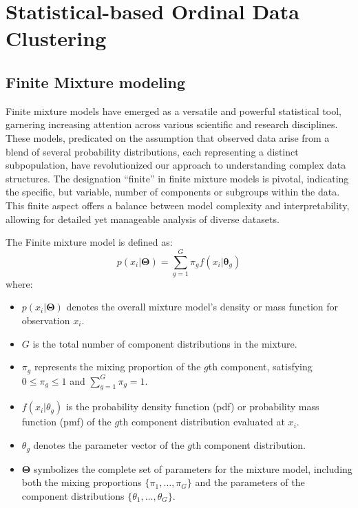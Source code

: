 \documentclass{article}
\begin{document}
\section{Statistical-based Ordinal Data Clustering}

\subsection{Finite Mixture modeling}

Finite mixture models have emerged as a versatile and powerful statistical tool, garnering increasing attention across various scientific and research disciplines. These models, predicated on the assumption that observed data arise from a blend of several probability distributions, each representing a distinct subpopulation, have revolutionized our approach to understanding complex data structures. The designation ``finite'' in finite mixture models is pivotal, indicating the specific, but variable, number of components or subgroups within the data. This finite aspect offers a balance between model complexity and interpretability, allowing for detailed yet manageable analysis of diverse datasets.

The Finite mixture model is defined as:
\begin{equation}
p(x_i|\mathbf{\Theta}) = \sum_{g=1}^{G} \pi_g f(x_i|\boldsymbol{\theta}_g)
\end{equation}
where:
\begin{itemize}
    \item $p(x_i|\mathbf{\Theta})$ denotes the overall mixture model's density or mass function for observation $x_i$.
    \item $G$ is the total number of component distributions in the mixture.
    \item $\pi_g$ represents the mixing proportion of the $g$th component, satisfying $0 \leq \pi_g \leq 1$ and $\sum_{g=1}^{G} \pi_g = 1$.
    \item $f(x_i|\theta_g)$ is the probability density function (pdf) or probability mass function (pmf) of the $g$th component distribution evaluated at $x_i$.
    \item $\theta_g$ denotes the parameter vector of the $g$th component distribution.
    \item $\mathbf{\Theta}$ symbolizes the complete set of parameters for the mixture model, including both the mixing proportions $\{\pi_1, \ldots, \pi_G\}$ and the parameters of the component distributions $\{\theta_1, \ldots, \theta_G\}$.
\end{itemize}
\end{document}
